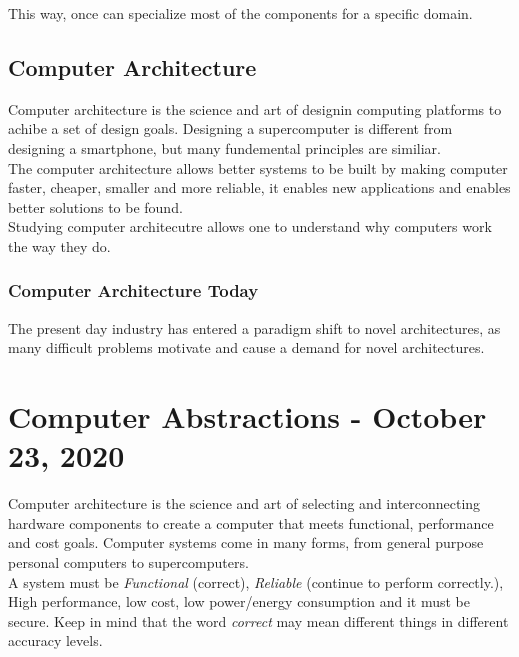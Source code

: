 \documentclass[11pt,a4paper,twocolumn]{book}
\begin{document}
This way, once can specialize most of the components for a specific domain.

\section{Computer Architecture}

Computer architecture is the science and art of designin computing platforms to achibe a set of design goals. Designing a supercomputer is different from designing a smartphone, but many fundemental principles are similiar.\\

The computer architecture allows better systems to be built by making computer faster, cheaper, smaller and more reliable, it enables new applications and enables better solutions to be found.\\

Studying computer architecutre allows one to understand why computers work the way they do.

\subsection{Computer Architecture Today}

The present day industry has entered a paradigm shift to novel architectures, as many difficult problems motivate and cause a demand for novel architectures.



\chapter{Computer Abstractions - October 23, 2020}


Computer architecture is the science and art of selecting and interconnecting hardware components to create a computer that meets functional, performance and cost goals. Computer systems come in many  forms, from general purpose personal computers to supercomputers.\\

A system must be \textit{Functional} (correct), \textit{Reliable} (continue to perform correctly.), High performance, low cost, low power/energy consumption and it must be secure. Keep in mind that the word \textit{correct} may mean different things in different accuracy levels.\\
\end{document}
